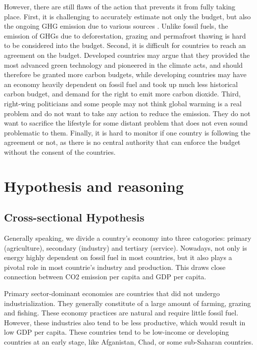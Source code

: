 \documentclass[a4paper]{article}
\begin{document}
However, there are still flaws of the action that prevents it from fully taking place. First, it is challenging to accurately estimate not only the budget, but also the ongoing GHG emission due to various sources \cite{essd-budget}. Unlike fossil fuels, the emission of GHGs due to deforestation, grazing and permafrost thawing is hard to be considered into the budget. Second, it is difficult for countries to reach an agreement on the budget. Developed countries may argue that they provided the most advanced green technology and pioneered in the climate acts, and should therefore be granted more carbon budgets, while developing countries may have an economy heavily dependent on fossil fuel and took up much less historical carbon budget, and demand for the right to emit more carbon dioxide. Third, right-wing politicians and some people may not think global warming is a real problem and do not want to take any action to reduce the emission. They do not want to sacrifice the lifestyle for some distant problem that does not even sound problematic to them. Finally, it is hard to monitor if one country is following the agreement or not, as there is no central authority that can enforce the budget without the consent of the countries. %

\section{Hypothesis and reasoning}

\subsection{Cross-sectional Hypothesis}

Generally speaking, we divide a country's economy into three catogories: primary (agriculture), secondary (industry) and tertiary (service). Nowadays, not only is energy highly dependent on fossil fuel in most countries, but it also plays a pivotal role in most countrie's industry and production. This draws close connection between CO2 emission per capita and GDP per capita.

Primary sector-dominant economies are countries that did not undergo industrialization. They generally constitute of a large amount of farming, grazing and fishing. These economy practices are natural and require little fossil fuel. However, these industries also tend to be less productive, which would result in low GDP per capita. These countries tend to be low-income or developing countries at an early stage, like Afganistan, Chad, or some sub-Saharan countries.
\end{document}
